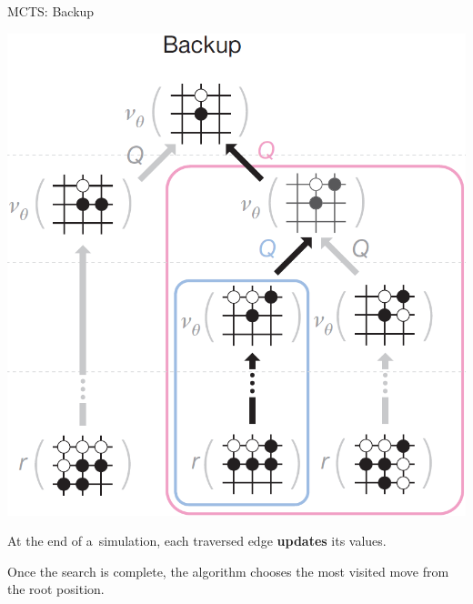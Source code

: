 \documentclass{beamer}
\begin{document}
{    \begin{frame}{MCTS: Backup}
      \begin{center}
        \includegraphics[height=.6\textheight]{../img/MCTS_backup.png}
      \end{center}
      
      At the end of a~simulation, each traversed edge \textbf{updates} its values.
    \end{frame}

    \begin{frame}[standout]
      Once the search is complete, the algorithm chooses \alert{the most visited move} from the root position.
    \end{frame}

}
\end{document}
